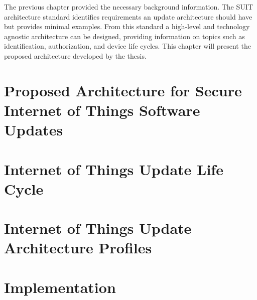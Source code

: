 \documentclass[0-thesis.tex]{subfiles}
\begin{document}
The previous chapter provided the necessary background information. The SUIT architecture
standard identifies requirements an update architecture should have but provides minimal
examples. From this standard a high-level and technology agnostic architecture can be
designed, providing information on topics such as identification, authorization, and
device life cycles. This chapter will present the proposed architecture developed by the
thesis.


\section{Proposed Architecture for Secure Internet of Things Software Updates}


\section{Internet of Things Update Life Cycle}


\section{Internet of Things Update Architecture Profiles}


\section{Implementation}

\end{document}
